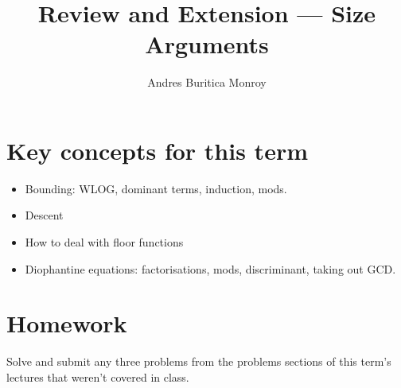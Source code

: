 \documentclass{article}
\title{Review and Extension --- Size Arguments}
\author{Andres Buritica Monroy}
\date{}
\begin{document}
\maketitle
\section{Key concepts for this term}
\begin{itemize}
	\item Bounding: WLOG, dominant terms, induction, mods.
	\item Descent
	\item How to deal with floor functions
	\item Diophantine equations: factorisations, mods, discriminant, taking out
	      GCD\@.
\end{itemize}
\section{Homework}
Solve and submit any three problems from the problems sections of this term's
lectures that weren't covered in class.
\end{document}
